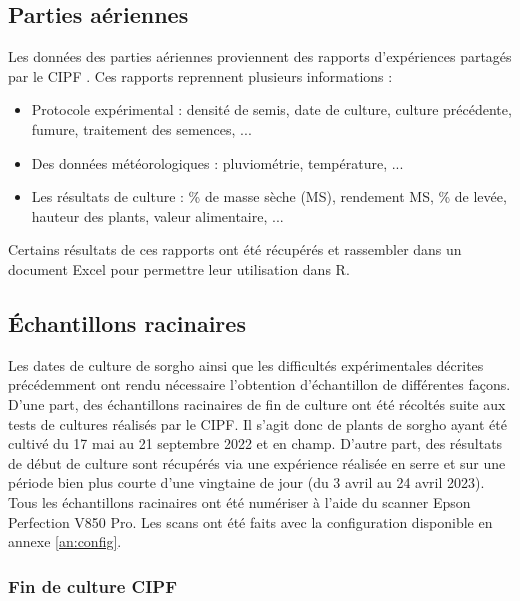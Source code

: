 \subsection{Parties aériennes}
Les données des parties aériennes proviennent des rapports d'expériences partagés par le CIPF \citep{cipf_resultats_2021,cipf_resultats_2022}.
Ces rapports reprennent plusieurs informations :
\begin{itemize}
    \item Protocole expérimental : densité de semis, date de culture, culture précédente, fumure, traitement des semences, ...
    \item Des données météorologiques : pluviométrie, température, ...
    \item Les résultats de culture : \% de masse sèche (MS), rendement MS, \% de levée, hauteur des plants, valeur alimentaire, ...
\end{itemize}
Certains résultats de ces rapports ont été récupérés et rassembler dans un document Excel pour permettre leur utilisation dans R.

\subsection{Échantillons racinaires}

Les dates de culture de sorgho ainsi que les difficultés expérimentales décrites précédemment ont rendu nécessaire l'obtention d'échantillon de différentes façons.
D'une part, des échantillons racinaires de fin de culture ont été récoltés suite aux tests de cultures réalisés par le CIPF. 
Il s'agit donc de plants de sorgho ayant été cultivé du 17 mai au 21 septembre 2022 et en champ.
D'autre part, des résultats de début de culture sont récupérés via une expérience réalisée en serre et sur une période bien plus courte d'une vingtaine de jour (du 3 avril au 24 avril 2023).
Tous les échantillons racinaires ont été numériser à l'aide du scanner Epson Perfection V850 Pro.
Les scans ont été faits avec la configuration disponible en annexe \ref{an:config}.

\subsubsection{Fin de culture CIPF}

